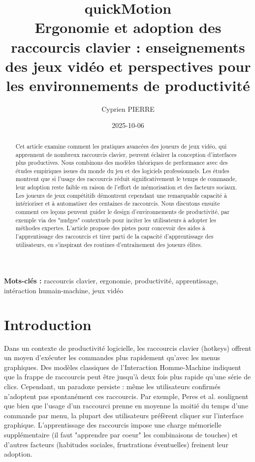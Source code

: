 \documentclass[a4paper,12pt]{article}
\author{Cyprien PIERRE \orcidlink{0009-0009-9040-6795}}
\date{2025-10-06}
\title{quickMotion\\\medskip
\large Ergonomie et adoption des raccourcis clavier : enseignements des jeux vidéo et perspectives pour les environnements de productivité}
\newenvironment{keyword}{\begin{trivlist}\item[]{\bfseries Mots-clés :}}{\end{trivlist}}
\begin{document}
\maketitle
\begin{abstract}
Cet article examine comment les pratiques avancées des joueurs de jeux vidéo, qui apprennent de nombreux raccourcis clavier, peuvent éclairer la conception d’interfaces plus productives. Nous combinons des modèles théoriques de performance avec des études empiriques issues du monde du jeu et des logiciels professionnels. Les études montrent que si l’usage des raccourcis réduit significativement le temps de commande, leur adoption reste faible en raison de l’effort de mémorisation et des facteurs sociaux\autocite{peresKeyboardShortcutUsage2004,raursoIntermodalImprovementNudging2020}. Les joueurs de jeux compétitifs démontrent cependant une remarquable capacité à intérioriser et à automatiser des centaines de raccourcis\autocite{huangMasterMakerUnderstanding2017}. Nous discutons ensuite comment ces leçons peuvent guider le design d’environnements de productivité, par exemple via des "nudges" contextuels pour inciter les utilisateurs à adopter les méthodes expertes\autocite{raursoIntermodalImprovementNudging2020}. L’article propose des pistes pour concevoir des aides à l’apprentissage des raccourcis et tirer parti de la capacité d’apprentissage des utilisateurs, en s’inspirant des routines d’entraînement des joueurs élites.
\end{abstract}

\begin{keyword}
raccourcis clavier, ergonomie, productivité, apprentissage, intéraction humain-machine, jeux vidéo
\end{keyword}
\section{Introduction}
\label{sec:org7002616}
Dans un contexte de productivité logicielle, les raccourcis clavier (hotkeys) offrent un moyen d’exécuter les commandes plus rapidement qu’avec les menus graphiques. Des modèles classiques de l’Interaction Homme-Machine indiquent que la frappe de raccourcis peut être jusqu’à deux fois plus rapide qu’une série de clics\autocite{peresKeyboardShortcutUsage2004,raursoIntermodalImprovementNudging2020}. Cependant, un paradoxe persiste : même les utilisateurs confirmés n’adoptent pas spontanément ces raccourcis. Par exemple, Peres et al. soulignent que bien que l’usage d’un raccourci prenne en moyenne la moitié du temps d’une commande par menu, la plupart des utilisateurs préfèrent cliquer sur l'interface graphique\autocite{peresKeyboardShortcutUsage2004}. L’apprentissage des raccourcis impose une charge mémorielle supplémentaire (il faut "apprendre par coeur" les combinaisons de touches) et d'autres facteurs (habitudes sociales, frustrations éventuelles) freinent leur adoption\autocite{peresKeyboardShortcutUsage2004,raursoIntermodalImprovementNudging2020}.
\end{document}
